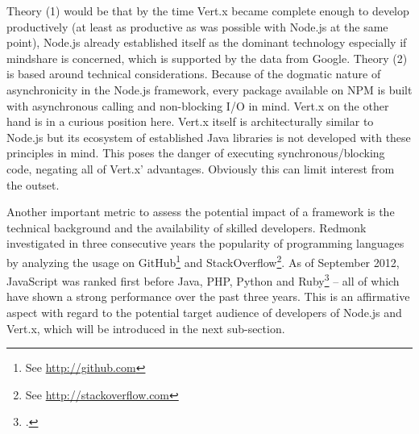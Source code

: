 Theory (1) would be that by the time Vert.x became complete enough to develop
productively (at least as productive as was possible with Node.js at the same
point), Node.js already established itself as the dominant technology especially if
mindshare is concerned, which is supported by the data from Google.
Theory (2) is based around technical considerations. Because of the dogmatic
nature of asynchronicity in the Node.js framework, every package available on
NPM is built with asynchronous calling
and non-blocking I/O in mind. Vert.x on the
other hand is in a curious position here. Vert.x itself is architecturally
similar to Node.js but its ecosystem of established Java libraries is not developed
with these principles in mind. This poses the danger of executing
synchronous/blocking code, negating all of Vert.x' advantages. Obviously this
can limit interest from the outset.

Another important metric to assess the potential impact of a framework is the
technical background and the availability of skilled developers. Redmonk
investigated in three consecutive years the popularity of programming languages
by analyzing the usage on GitHub\footnote{See \url{http://github.com}} and
StackOverflow\footnote{See \url{http://stackoverflow.com}}. As of September
2012, JavaScript was ranked first before Java, PHP, Python and
Ruby\footcite[Cf.][]{Redmonk_2012} – all of which have shown a strong
performance over the past three years. This is an affirmative aspect with regard
to the potential target audience of developers of Node.js and Vert.x, which will
be introduced in the next sub-section.


